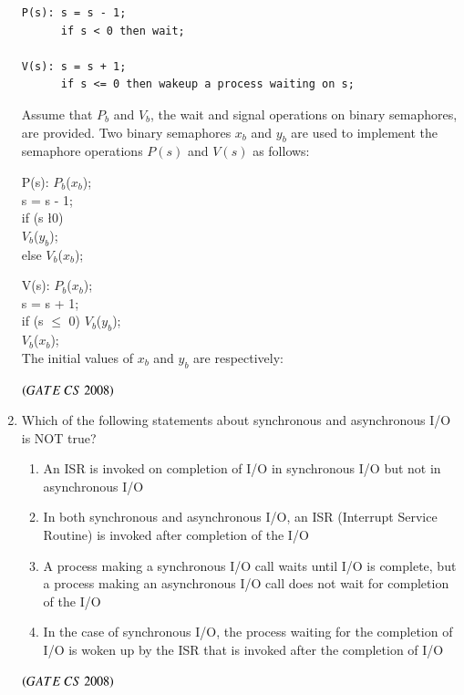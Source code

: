 \documentclass[journal]{IEEEtran}
\numberwithin{equation}{enumi}
\numberwithin{figure}{enumi}
\begin{document}
\begin{enumerate}
\begin{verbatim}
P(s): s = s - 1;
      if s < 0 then wait;

V(s): s = s + 1;
      if s <= 0 then wakeup a process waiting on s;
\end{verbatim}

Assume that $P_b$ and $V_b$, the wait and signal operations on binary semaphores, are provided. 
Two binary semaphores $x_b$ and $y_b$ are used to implement the semaphore operations $P(s)$ and $V(s)$ as follows:


P(s):   $P_b$($x_b$);\\
        s = s - 1;\\
        if (s \l 0)  \\
            $V_b$($y_b$);\\
        else $V_b$($x_b$);

V(s):   $P_b$($x_b$);\\
        s = s + 1;\\
        if (s $\leq$ 0) $V_b$($y_b$);\\ 
        $V_b$($x_b$);\\
The initial values of $x_b$ and $y_b$ are respectively:
\begin{enumerate}
\end{enumerate}
\hfill $\left(GATE\ CS\  2008\right)$

\item Which of the following statements about synchronous and asynchronous I/O is
NOT true? 
\begin{enumerate}
    \item An ISR is invoked on completion of I/O in synchronous I/O but not in
asynchronous I/O
   \item In both synchronous and asynchronous I/O, an ISR (Interrupt Service Routine) is invoked after completion of the I/O
   \item A process making a synchronous I/O call waits until I/O is complete, but a
process making an asynchronous I/O call does not wait for completion of the I/O
   \item In the case of synchronous I/O, the process waiting for the completion of I/O is woken up by the ISR that is invoked after the completion of I/O 
\end{enumerate}
\hfill $\left(GATE\ CS\  2008\right)$
 


\end{enumerate}
\end{document}
